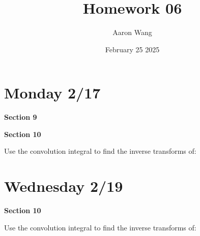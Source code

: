 \documentclass{article}
\title{Homework 06}
\author{Aaron Wang}
\date{February 25 2025}
\begin{document}
\maketitle
\section{Monday 2/17}
\begin{large}
 \textbf{Section 9}   
\end{large}
\begin{enumerate}
    \newpage
    \newpage
    \newpage
\end{enumerate}
\begin{large}
 \textbf{Section 10}   
\end{large}
Use the convolution integral to find the inverse transforms of:
\begin{enumerate}
    \newpage
    \newpage
    \newpage
\end{enumerate}
\newpage
\section{Wednesday 2/19}
\begin{large}
 \textbf{Section 10}   
\end{large}
Use the convolution integral to find the inverse transforms of:
\begin{enumerate}
    \newpage
    \newpage
    \newpage
    \newpage
    \newpage
\end{enumerate}
\end{document}

